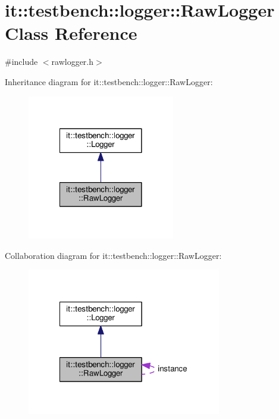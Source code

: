 \hypertarget{classit_1_1testbench_1_1logger_1_1RawLogger}{\section{it\-:\-:testbench\-:\-:logger\-:\-:Raw\-Logger Class Reference}
\label{d0/d37/classit_1_1testbench_1_1logger_1_1RawLogger}
}


{\ttfamily \#include $<$rawlogger.\-h$>$}



Inheritance diagram for it\-:\-:testbench\-:\-:logger\-:\-:Raw\-Logger\-:
\nopagebreak
\begin{figure}[H]
\begin{center}
\leavevmode
\includegraphics[width=182pt]{de/de6/classit_1_1testbench_1_1logger_1_1RawLogger__inherit__graph}
\end{center}
\end{figure}


Collaboration diagram for it\-:\-:testbench\-:\-:logger\-:\-:Raw\-Logger\-:
\nopagebreak
\begin{figure}[H]
\begin{center}
\leavevmode
\includegraphics[width=240pt]{d6/d04/classit_1_1testbench_1_1logger_1_1RawLogger__coll__graph}
\end{center}
\end{figure}
